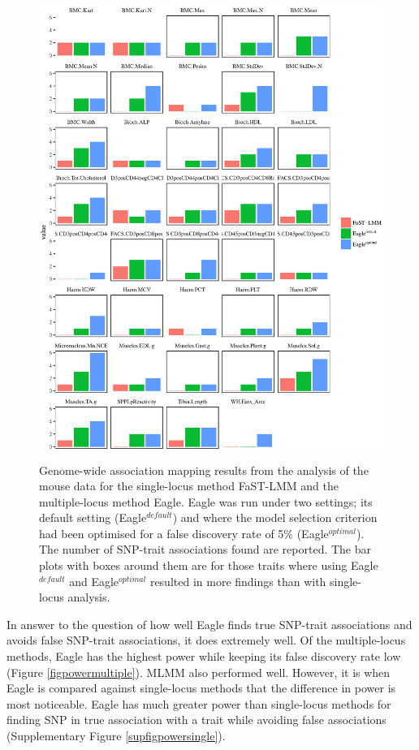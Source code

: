 \documentclass{article}
\begin{document}
\begin{figure}
\caption{Genome-wide association mapping results from the analysis of the mouse data for the single-locus method FaST-LMM and the 
multiple-locus method
Eagle. Eagle was run under two settings; its default setting (Eagle$^{default}$) and where the model selection criterion had been optimised 
for a false discovery rate of 5\% (Eagle$^{optimal}$). 
The number of SNP-trait associations found are reported. The bar plots with boxes around them are for those traits where using 
Eagle$^{default}$ and Eagle$^{optimal}$ resulted in more findings than with single-locus analysis.} 
\label{figmouse}
\begin{center}
\includegraphics[width=15cm, height=15cm]{mouseresults.eps}
\end{center}

\end{figure}





In answer to the question of how well Eagle finds true SNP-trait associations and avoids false SNP-trait associations, it does extremely 
well.  Of the multiple-locus methods, Eagle has the highest power
while keeping its false discovery rate low (Figure \ref{figpowermultiple}). MLMM also performed well. However, it is when Eagle is compared against single-locus methods 
that the difference in power is most noticeable.  Eagle has much greater power than single-locus methods for finding SNP in true 
association with a trait while avoiding false associations (Supplementary Figure \ref{supfigpowersingle}). 
\end{document}
